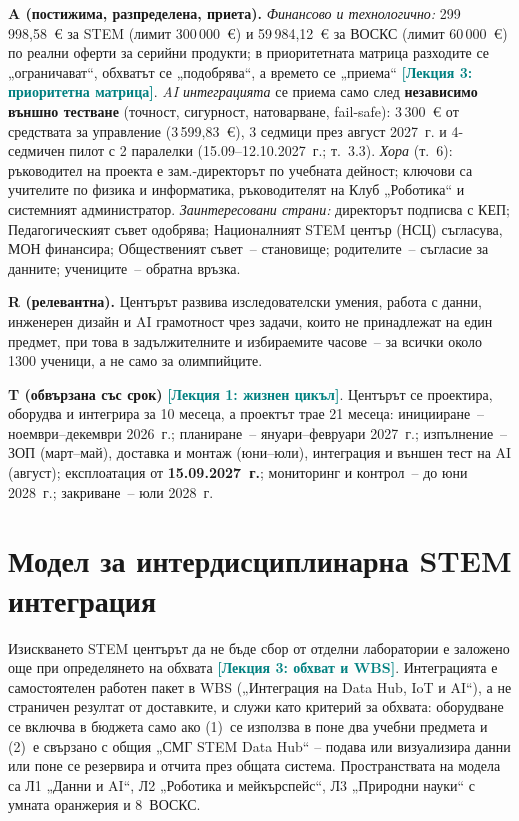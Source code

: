 \documentclass[11pt,a4paper]{article}
\newcommand{\lecturetag}[1]{\textcolor{teal}{\small\bfseries[#1]}}
\newcommand{\NumSTEM}{299\,998,58~€}
\newcommand{\NumVOSKS}{59\,984,12~€}
\newcommand{\NumMgmt}{3\,599,83~€}
\begin{document}
\textbf{A (постижима, разпределена, приета).} \emph{Финансово и технологично:} \NumSTEM{} за STEM (лимит 300\,000~€) и \NumVOSKS{} за ВОСКС (лимит 60\,000~€) по реални оферти за серийни продукти; в приоритетната матрица разходите се „ограничават“, обхватът се „подобрява“, а времето се „приема“ \lecturetag{Лекция 3: приоритетна матрица}. \emph{AI интеграцията} се приема само след \textbf{независимо външно тестване} (точност, сигурност, натоварване, fail-safe): 3\,300~€ от средствата за управление (\NumMgmt), 3 седмици през август 2027~г. и 4-седмичен пилот с 2 паралелки (15.09–12.10.2027~г.; т.~3.3). \emph{Хора} (т.~6): ръководител на проекта е зам.-директорът по учебната дейност; ключови са учителите по физика и информатика, ръководителят на Клуб „Роботика“ и системният администратор. \emph{Заинтересовани страни:} директорът подписва с КЕП; Педагогическият съвет одобрява; Националният STEM център (НСЦ) съгласува, МОН финансира; Общественият съвет~– становище; родителите~– съгласие за данните; учениците~– обратна връзка.

\textbf{R (релевантна).} Центърът развива изследователски умения, работа с данни, инженерен дизайн и AI грамотност чрез задачи, които не принадлежат на един предмет, при това в задължителните и избираемите часове~– за всички около 1300 ученици, а не само за олимпийците.

\textbf{T (обвързана със срок)} \lecturetag{Лекция 1: жизнен цикъл}. Центърът се проектира, оборудва и интегрира за 10 месеца, а проектът трае 21 месеца: иницииране~– ноември–декември 2026~г.; планиране~– януари–февруари 2027~г.; изпълнение~– ЗОП (март–май), доставка и монтаж (юни–юли), интеграция и външен тест на AI (август); експлоатация от \textbf{15.09.2027~г.}; мониторинг и контрол~– до юни 2028~г.; закриване~– юли 2028~г.

\clearpage%
\section{Модел за интердисциплинарна STEM интеграция}
\providecommand{\sIIcheck}{\tikz[baseline=-0.25ex,x=1ex,y=1ex]\draw[teal,line width=1.1pt,line cap=round,line join=round](0,0.5)--(0.4,0.05)--(1.15,1.05);}

Изискването STEM центърът да не бъде сбор от отделни лаборатории е заложено още при определянето на обхвата \lecturetag{Лекция 3: обхват и WBS}. Интеграцията е самостоятелен работен пакет в WBS („Интеграция на Data Hub, IoT и AI“), а не страничен резултат от доставките, и служи като критерий за обхвата: оборудване се включва в бюджета само ако (1)~се използва в поне два учебни предмета и (2)~е свързано с общия „СМГ STEM Data Hub“ – подава или визуализира данни или поне се резервира и отчита през общата система. Пространствата на модела са Л1 „Данни и AI“, Л2 „Роботика и мейкърспейс“, Л3 „Природни науки“ с умната оранжерия и 8~ВОСКС.
\end{document}
